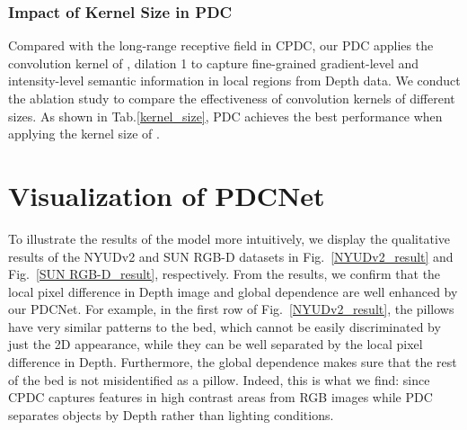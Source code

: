 \documentclass[lettersize,journal]{IEEEtran}
\begin{document}
\begin{table}
\centering
\caption{Impact of kernel size in PDC tested on NYUDv2 dataset under multi-scale testing. }
\end{table}


\subsubsection{Impact of Kernel Size in PDC}
Compared with the long-range receptive field in CPDC, our PDC applies the convolution kernel of , dilation 1 to capture fine-grained gradient-level and intensity-level semantic information in local regions from Depth data. We conduct the ablation study to compare the effectiveness of convolution kernels of different sizes. As shown in Tab.\ref{kernel_size}, PDC achieves the best performance when applying the kernel size of . 
















\section{Visualization of PDCNet}
To illustrate the results of the model more intuitively, we display the qualitative results of the NYUDv2 and SUN RGB-D datasets in Fig.~\ref{NYUDv2_result} and Fig.~\ref{SUN RGB-D_result}, respectively. From the results, we confirm that the local pixel difference in Depth image and global dependence are well enhanced by our PDCNet. For example, in the first row of Fig.~\ref{NYUDv2_result}, the pillows have very similar patterns to the bed, which cannot be easily discriminated by just the 2D appearance, while they can be well separated by the local pixel difference in Depth. Furthermore, the global dependence makes sure that the rest of the bed is not misidentified as a pillow. Indeed, this is what we find: since CPDC captures features in high contrast areas from RGB images while PDC separates objects by Depth rather than lighting conditions. 
\end{document}
